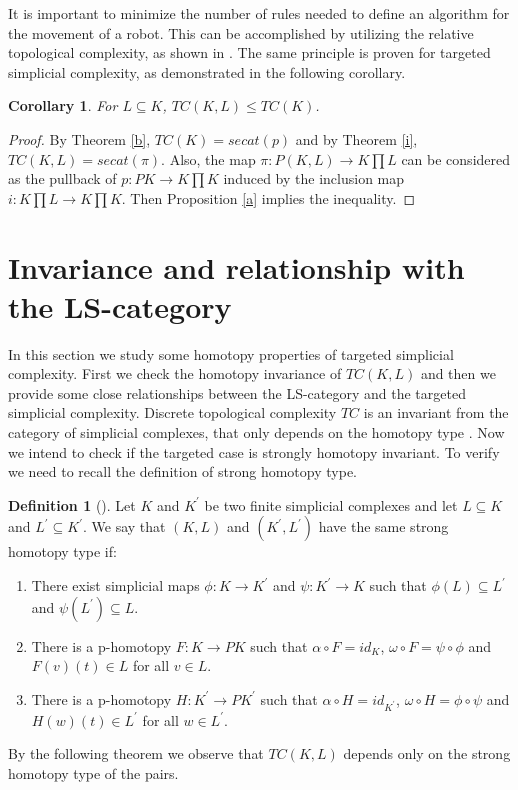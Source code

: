 \documentclass[preprint,11pt %
]{hjm1}
\newtheorem{corollary}[theorem]{Corollary}
\theoremstyle{definition}
\newtheorem{definition}[theorem]{Definition}
\begin{document}
It is important to minimize the number of rules needed to define an algorithm for the movement of a robot. This can be accomplished by utilizing the relative topological complexity, as shown in \cite{rel}. The same principle is proven for targeted simplicial complexity, as demonstrated in the following corollary.

\begin{corollary}\label{c}
For $L\subseteq K$, $TC(K,L)\leq TC(K)$.
\end{corollary}

\begin{proof}
By Theorem
\ref{b}, $TC(K)=secat (p)$ and by Theorem \ref{i}, $TC(K,L)=secat (\pi )$. Also,  the map $\pi :P(K,L) \to K \prod L$ can be considered as the pullback of $p: PK \to K\prod K$ induced by the inclusion map $i:K \prod L \to K \prod K$. Then Proposition \ref{a} implies the inequality.
\end{proof}

\section{Invariance and relationship with the LS-category}\label{category}

In this section we study some homotopy properties of  targeted simplicial complexity. First we check the homotopy invariance of $TC(K, L)$ and then  we provide some close relationships between the LS-category and the targeted simplicial complexity.
Discrete topological complexity $TC$ is an invariant from the category of simplicial complexes, that only depends on the homotopy type \cite{dis}. Now we intend to check if the targeted case is strongly homotopy invariant. To verify we need to recall the definition of strong homotopy type.
 
\begin{definition}[\cite{dis}]
Let $K$ and $K^{'}$ be two finite simplicial complexes and let $L\subseteq K$ and $L^{'}\subseteq K^{'}$. We say that $(K,L)$ and $(K^{'},L^{'})$ have the same strong homotopy type if:
\begin{enumerate}
\item[(i)]
There exist simplicial maps $\phi :K\to K^{'}$ and $\psi :K^{'}\to K $ such that $\phi (L)\subseteq L^{'}$ and $\psi (L^{'})\subseteq L$.
\item[(ii)]
There is a p-homotopy $F:K\to PK$ such that $\alpha \circ F=id_K$, $\omega \circ F=\psi \circ \phi $ and $F(v)(t)\in L$ for all $v\in L$.
\item[(iii)]
There is a p-homotopy $H:K^{'}\to PK^{'}$ such that $\alpha \circ H =id_{K^{'}}$, $\omega \circ H=\phi \circ \psi $ and $H(w)(t)\in L^{'}$ for all $w\in L^{'}$.
\end{enumerate}

\end{definition}
By the following theorem we observe that $TC(K,L)$ depends only on the strong homotopy type of the pairs.
\end{document}
